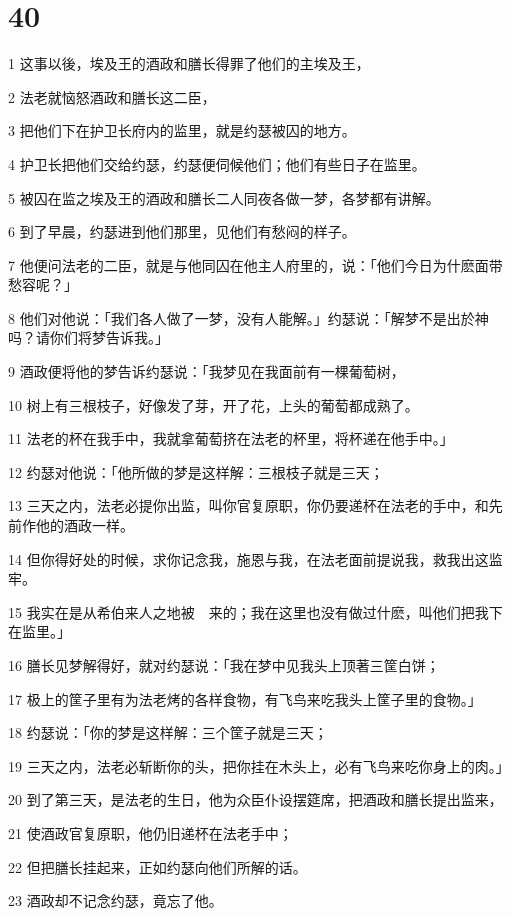 \chapter{40}

\par 1 这事以後，埃及王的酒政和膳长得罪了他们的主埃及王，
\par 2 法老就恼怒酒政和膳长这二臣，
\par 3 把他们下在护卫长府内的监里，就是约瑟被囚的地方。
\par 4 护卫长把他们交给约瑟，约瑟便伺候他们；他们有些日子在监里。
\par 5 被囚在监之埃及王的酒政和膳长二人同夜各做一梦，各梦都有讲解。
\par 6 到了早晨，约瑟进到他们那里，见他们有愁闷的样子。
\par 7 他便问法老的二臣，就是与他同囚在他主人府里的，说：「他们今日为什麽面带愁容呢？」
\par 8 他们对他说：「我们各人做了一梦，没有人能解。」约瑟说：「解梦不是出於神吗？请你们将梦告诉我。」
\par 9 酒政便将他的梦告诉约瑟说：「我梦见在我面前有一棵葡萄树，
\par 10 树上有三根枝子，好像发了芽，开了花，上头的葡萄都成熟了。
\par 11 法老的杯在我手中，我就拿葡萄挤在法老的杯里，将杯递在他手中。」
\par 12 约瑟对他说：「他所做的梦是这样解：三根枝子就是三天；
\par 13 三天之内，法老必提你出监，叫你官复原职，你仍要递杯在法老的手中，和先前作他的酒政一样。
\par 14 但你得好处的时候，求你记念我，施恩与我，在法老面前提说我，救我出这监牢。
\par 15 我实在是从希伯来人之地被　来的；我在这里也没有做过什麽，叫他们把我下在监里。」
\par 16 膳长见梦解得好，就对约瑟说：「我在梦中见我头上顶著三筐白饼；
\par 17 极上的筐子里有为法老烤的各样食物，有飞鸟来吃我头上筐子里的食物。」
\par 18 约瑟说：「你的梦是这样解：三个筐子就是三天；
\par 19 三天之内，法老必斩断你的头，把你挂在木头上，必有飞鸟来吃你身上的肉。」
\par 20 到了第三天，是法老的生日，他为众臣仆设摆筵席，把酒政和膳长提出监来，
\par 21 使酒政官复原职，他仍旧递杯在法老手中；
\par 22 但把膳长挂起来，正如约瑟向他们所解的话。
\par 23 酒政却不记念约瑟，竟忘了他。

